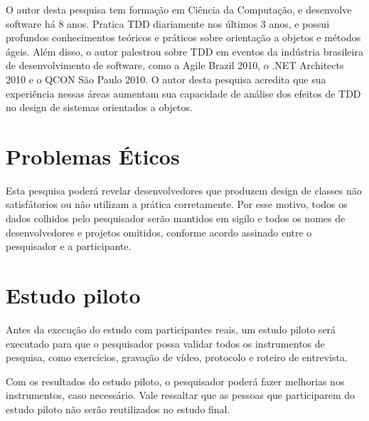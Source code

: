 O autor desta pesquisa tem formação em Ciência da Computação, e desenvolve software há 8
anos. Pratica TDD diariamente nos últimos 3 anos, e possui profundos
conhecimentos teóricos e práticos sobre orientação a objetos e métodos ágeis.
Além disso, o autor palestrou sobre TDD em eventos da indústria brasileira
de desenvolvimento de software, como a Agile Brazil 2010, o .NET Architects
2010 e o QCON São Paulo 2010. O autor desta pesquisa acredita que sua experiência nessas
áreas aumentam sua capacidade de análise dos efeitos de TDD no design de sistemas 
orientados a objetos.

\section{Problemas Éticos}
\label{sec:planejamento-etica}

Esta pesquisa poderá revelar desenvolvedores que produzem design de classes não
satisfátorios ou não utilizam a prática corretamente.
Por esse motivo, todos os dados colhidos pelo pesquisador serão mantidos em
sigilo e todos os nomes de desenvolvedores e projetos omitidos, conforme acordo 
assinado entre o pesquisador e a participante.

\section{Estudo piloto}
\label{sec:estudo-piloto}

Antes da execução do estudo com participantes reais, um estudo piloto será
executado para que o pesquisador possa validar todos os instrumentos de pesquisa,
como exercícios, gravação de vídeo, protocolo e roteiro de entrevista.

Com os resultados do estudo piloto, o pesquisador poderá fazer melhorias
nos instrumentos, caso necessário.
Vale ressaltar que as pessoas que participarem do estudo piloto não serão reutilizados no
estudo final.